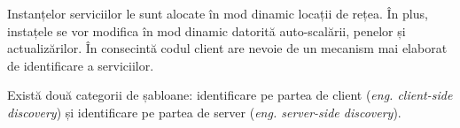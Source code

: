 \documentclass[12pt, a4paper, oneside, romanian]{teza-upb}
\begin{document}
Instanțelor serviciilor le sunt alocate în mod dinamic locații de rețea.  În plus, instațele se vor modifica în mod dinamic datorită auto-scalării, penelor și actualizărilor. În  consecintă codul client are nevoie de un mecanism mai elaborat de identificare a serviciilor. 

Există două categorii de șabloane: identificare pe partea de client (\textit{eng. client-side discovery}) și identificare pe partea de server (\textit{eng. server-side discovery}).
\end{document}

